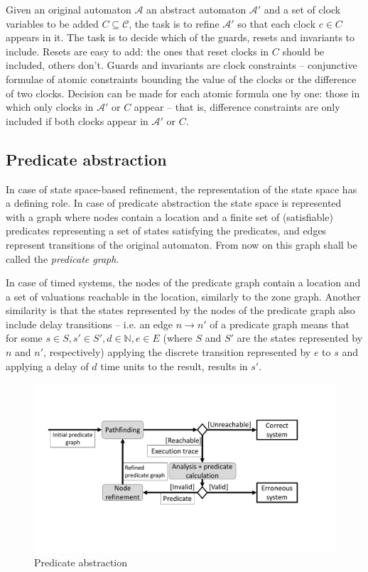 Given an original automaton $\mathcal{A}$ an abstract automaton $\mathcal{A'}$ and a set of clock variables to be added $C \subseteq \mathcal{C}$, the task is to refine $\mathcal{A'}$ so that each clock $c \in C$ appears in it. The task is to decide which of the guards, resets and invariants to include. Resets are easy to add: the ones that reset clocks in $C$ should be included, others don't. Guards and invariants are clock constraints -- conjunctive formulae of atomic constraints bounding the value of the clocks or the difference of two clocks. Decision can be made for each atomic formula one by one: those in which only clocks in $\mathcal{A'}$ or $C$ appear -- that is, difference constraints are only included if both clocks appear in $\mathcal{A'}$ or $C$.

\subsection{Predicate abstraction}

In case of state space-based refinement, the representation of the state space has a defining role. In case of predicate abstraction \cite{Graf97a} the state space is represented with a graph where nodes contain a location and a finite set of (satisfiable) predicates representing a set of states satisfying the predicates, and edges represent transitions of the original automaton. From now on this graph shall be called the \emph{predicate graph}.

In case of timed systems, the nodes of the predicate graph contain a location and a set of valuations reachable in the location, similarly to the zone graph. Another similarity is that the states represented by the nodes of the predicate graph also include delay transitions -- i.e. an edge $n \to n'$ of a predicate graph means that for some $s \in S, s' \in S', d \in \mathds{N}, e \in E$ (where $S$ and $S'$ are the states represented by $n$ and $n'$, respectively) applying the discrete transition represented by $e$ to $s$ and applying a delay of $d$ time units to the result, results in $s'$.

\begin{figure} 
	\centering
	\includegraphics[width=.7\textwidth]{include/figures/cegar_pred}
	\caption{Predicate abstraction}
	\label{fig:cegarpred}
\end{figure}

